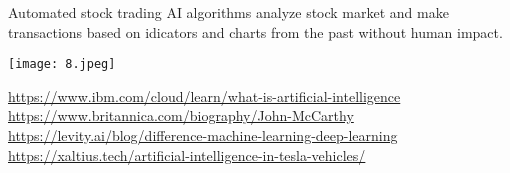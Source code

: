 \documentclass{beamer}
\begin{document}
\begin{frame}{Automated stock trading }
AI algorithms analyze stock market and make transactions based on idicators and charts from the past without human impact. 
\pause
\begin{center}
\texttt{[image: 8.jpeg]}
\end{center}
\end{frame}

\begin{thebibliography}{4}
\url{https://www.ibm.com/cloud/learn/what-is-artificial-intelligence}
\url{https://www.britannica.com/biography/John-McCarthy}
\url{https://levity.ai/blog/difference-machine-learning-deep-learning}
\url{https://xaltius.tech/artificial-intelligence-in-tesla-vehicles/}
\end{thebibliography}
\end{document}
